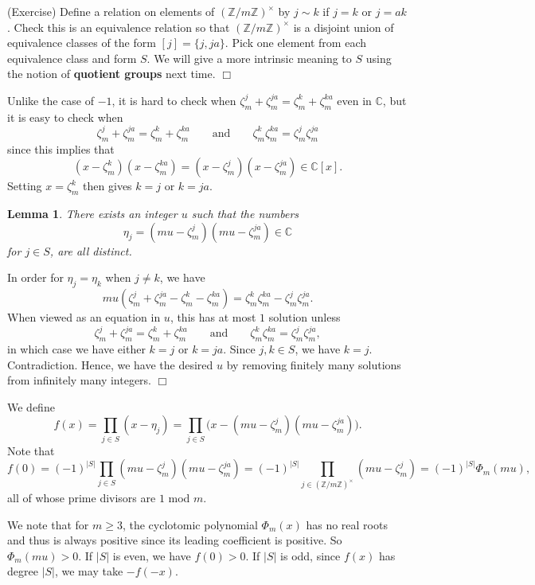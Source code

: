 \documentclass{article}
\def\Z{{\mathbb Z}}
\def\Z{{\mathbb Z}}
\def\C{{\mathbb C}}
\newtheorem{lemma}[subsection]{Lemma}
\newenvironment{proof}{\noindent {\bf Proof:}}{$\Box$ \vspace{2 ex}}
\begin{document}
\begin{proof}
    (Exercise) Define a relation on elements of $(\Z/m\Z)^\times$ by $j\sim k$ if $j = k$ or $j = ak$. Check this is an equivalence relation so that $(\Z/m\Z)^\times$ is a disjoint union of equivalence classes of the form $[j] = \{j, ja\}$. Pick one element from each equivalence class and form $S$. We will give a more intrinsic meaning to $S$ using the notion of \textbf{quotient groups} next time. 
\end{proof}

Unlike the case of $-1$, it is hard to check when $\zeta_m^j + \zeta_m^{ja} = \zeta_m^k + \zeta_m^{ka}$ even in $\C$, but it is easy to check when 
$$\zeta_m^j + \zeta_m^{ja} = \zeta_m^k + \zeta_m^{ka}\qquad\mbox{and}\qquad\zeta_m^k\zeta_m^{ka} = \zeta_m^j\zeta_m^{ja}$$
since this implies that 
$$(x - \zeta_m^k)(x - \zeta_m^{ka}) = (x - \zeta_m^j)(x - \zeta_m^{ja}) \in \C[x].$$
Setting $x = \zeta_m^k$ then gives $k = j$ or $k = ja$.

\begin{lemma}
    There exists an integer $u$ such that the numbers $$\eta_j = (mu - \zeta_m^j)(mu - \zeta_m^{ja}) \in \C$$
    for $j\in S$, are all distinct.
\end{lemma}

\begin{proof}
    In order for $\eta_j = \eta_k$ when $j\neq k$, we have $$mu(\zeta_m^j + \zeta_m^{ja} - \zeta_m^k - \zeta_m^{ka}) = \zeta_m^k\zeta_m^{ka} - \zeta_m^j\zeta_m^{ja}.$$
    When viewed as an equation in $u$, this has at most $1$ solution unless
    $$\zeta_m^j + \zeta_m^{ja} = \zeta_m^k + \zeta_m^{ka}\qquad\mbox{and}\qquad\zeta_m^k\zeta_m^{ka} = \zeta_m^j\zeta_m^{ja},$$
    in which case we have either $k = j$ or $k = ja$. Since $j,k\in S$, we have $k = j$. Contradiction. Hence, we have the desired $u$ by removing finitely many solutions from infinitely many integers.
\end{proof}

We define $$f(x) = \prod_{j\in S}(x - \eta_j) = \prod_{j\in S}\Big(x - (mu - \zeta_m^j)(mu - \zeta_m^{ja})\Big).$$
Note that
$$f(0) = (-1)^{|S|}\prod_{j\in S}(mu - \zeta_m^j)(mu - \zeta_m^{ja}) = (-1)^{|S|}\prod_{j\in (\Z/m\Z)^\times}(mu - \zeta_m^j) = (-1)^{|S|}\Phi_m(mu),$$
all of whose prime divisors are $1$ mod $m$. 

We note that for $m\geq 3$, the cyclotomic polynomial $\Phi_m(x)$ has no real roots and thus is always positive since its leading coefficient is positive. So $\Phi_m(mu) >0$. If $|S|$ is even, we have $f(0)>0$. If $|S|$ is odd, since $f(x)$ has degree $|S|$, we may take $-f(-x)$.
\end{document}
